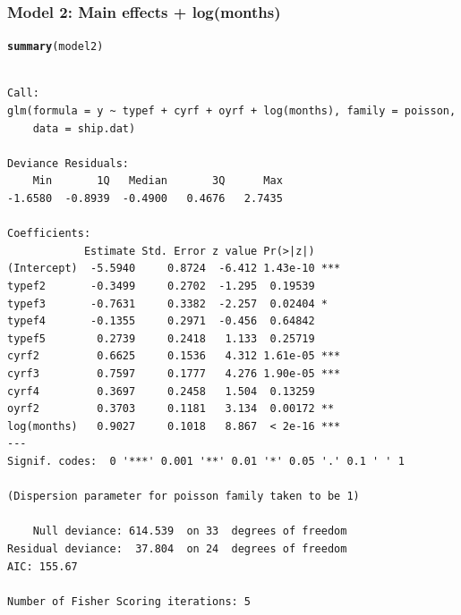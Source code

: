 \documentclass[oneside]{book}\usepackage[]{graphicx}\usepackage[svgnames]{xcolor}
\makeatletter
\newcommand{\hlstd}[1]{\textcolor[rgb]{0.345,0.345,0.345}{#1}}%
\newcommand{\hlkwd}[1]{\textcolor[rgb]{0.737,0.353,0.396}{\textbf{#1}}}%
\newenvironment{kframe}{%
 \def\at@end@of@kframe{}%
 \ifinner\ifhmode%
  \def\at@end@of@kframe{\end{minipage}}%
  \begin{minipage}{\columnwidth}%
 \fi\fi%
 \def\FrameCommand##1{\hskip\@totalleftmargin \hskip-\fboxsep
 \colorbox{shadecolor}{##1}\hskip-\fboxsep
     \hskip-\linewidth \hskip-\@totalleftmargin \hskip\columnwidth}%
 \MakeFramed {\advance\hsize-\width
   \@totalleftmargin\z@ \linewidth\hsize
   \@setminipage}}%
 {\par\unskip\endMakeFramed%
 \at@end@of@kframe}
\newenvironment{knitrout}{}{} %
\makeatother
\begin{document}
\subsubsection*{Model 2: Main effects + log(months)}
\begin{knitrout}
\color{fgcolor}\begin{kframe}
\begin{alltt}
\hlkwd{summary}\hlstd{(model2)}
\end{alltt}
\begin{verbatim}

Call:
glm(formula = y ~ typef + cyrf + oyrf + log(months), family = poisson, 
    data = ship.dat)

Deviance Residuals: 
    Min       1Q   Median       3Q      Max  
-1.6580  -0.8939  -0.4900   0.4676   2.7435  

Coefficients:
            Estimate Std. Error z value Pr(>|z|)    
(Intercept)  -5.5940     0.8724  -6.412 1.43e-10 ***
typef2       -0.3499     0.2702  -1.295  0.19539    
typef3       -0.7631     0.3382  -2.257  0.02404 *  
typef4       -0.1355     0.2971  -0.456  0.64842    
typef5        0.2739     0.2418   1.133  0.25719    
cyrf2         0.6625     0.1536   4.312 1.61e-05 ***
cyrf3         0.7597     0.1777   4.276 1.90e-05 ***
cyrf4         0.3697     0.2458   1.504  0.13259    
oyrf2         0.3703     0.1181   3.134  0.00172 ** 
log(months)   0.9027     0.1018   8.867  < 2e-16 ***
---
Signif. codes:  0 '***' 0.001 '**' 0.01 '*' 0.05 '.' 0.1 ' ' 1

(Dispersion parameter for poisson family taken to be 1)

    Null deviance: 614.539  on 33  degrees of freedom
Residual deviance:  37.804  on 24  degrees of freedom
AIC: 155.67

Number of Fisher Scoring iterations: 5
\end{verbatim}
\end{kframe}
\end{knitrout}
\end{document}
